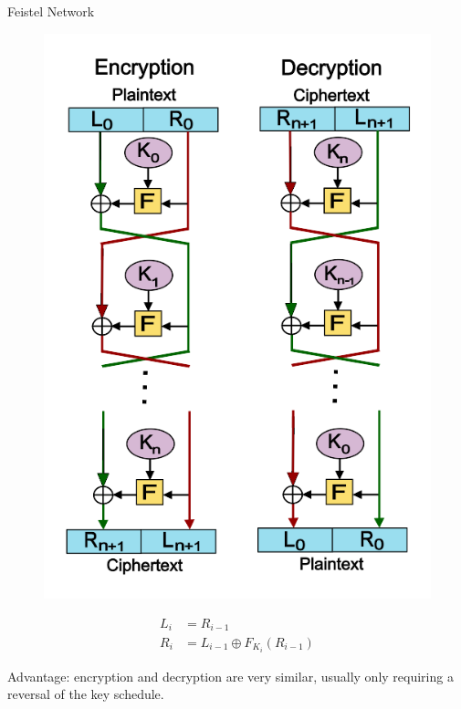 \documentclass{beamer}
\begin{document}
\begin{frame}{Feistel Network}
	\begin{minipage}{0.5\textwidth}
		\begin{figure}[h!]
			\centering
			\includegraphics[width=\textwidth,height=0.8\textheight,keepaspectratio]{feistel-structure}
		\end{figure}
	\end{minipage}
	\begin{minipage}{0.4\textwidth}
		\begin{align*}
			L_i &= R_{i-1} \\
			R_i &= L_{i-1} \oplus F_{K_i}(R_{i-1})
		\end{align*}

		Advantage: encryption and decryption are very similar,
		usually only requiring a reversal of the key schedule.
	\end{minipage}

\end{frame}
\end{document}
